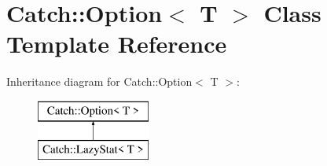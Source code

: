 \hypertarget{class_catch_1_1_option}{\section{Catch\-:\-:Option$<$ T $>$ Class Template Reference}
\label{class_catch_1_1_option}
}
Inheritance diagram for Catch\-:\-:Option$<$ T $>$\-:\begin{figure}[H]
\begin{center}
\leavevmode
\includegraphics[height=2.000000cm]{class_catch_1_1_option}
\end{center}
\end{figure}
